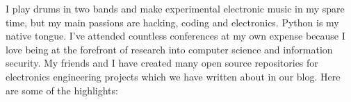 
\begin{cvparagraph}
I play drums in two bands and make experimental electronic music in my spare time, but my main passions are hacking, coding and electronics. Python is my native tongue. I've attended countless conferences at my own expense because I love being at the forefront of research into computer science and information security. My friends and I have created many open source repositories for electronics engineering projects which we have written about in our blog. Here are some of the highlights:
\end{cvparagraph}

